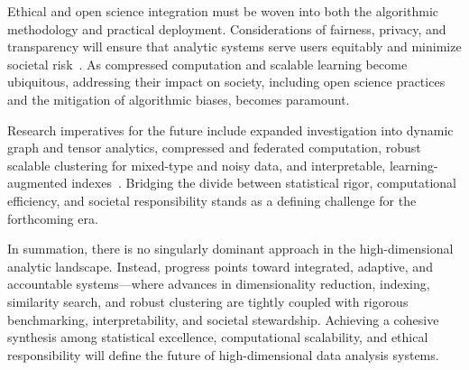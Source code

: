 \documentclass[sigconf]{acmart}
\begin{document}
Ethical and open science integration must be woven into both the algorithmic methodology and practical deployment. Considerations of fairness, privacy, and transparency will ensure that analytic systems serve users equitably and minimize societal risk~\cite{ref117,ref118}. As compressed computation and scalable learning become ubiquitous, addressing their impact on society, including open science practices and the mitigation of algorithmic biases, becomes paramount.

Research imperatives for the future include expanded investigation into dynamic graph and tensor analytics, compressed and federated computation, robust scalable clustering for mixed-type and noisy data, and interpretable, learning-augmented indexes~\cite{ref110,ref116,ref118}. Bridging the divide between statistical rigor, computational efficiency, and societal responsibility stands as a defining challenge for the forthcoming era.

In summation, there is no singularly dominant approach in the high-dimensional analytic landscape. Instead, progress points toward integrated, adaptive, and accountable systems—where advances in dimensionality reduction, indexing, similarity search, and robust clustering are tightly coupled with rigorous benchmarking, interpretability, and societal stewardship. Achieving a cohesive synthesis among statistical excellence, computational scalability, and ethical responsibility will define the future of high-dimensional data analysis systems.



\end{document}

